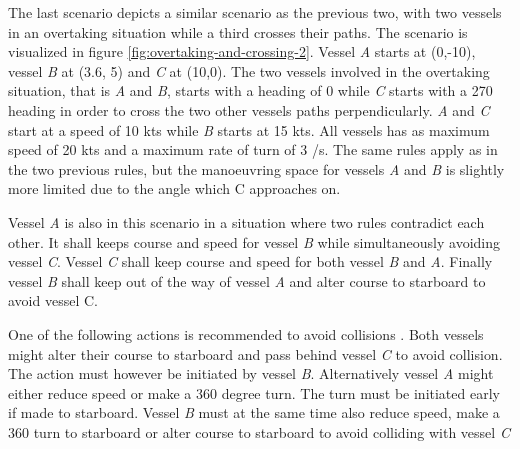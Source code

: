 The last scenario depicts a similar scenario as the previous two, with two vessels in an overtaking situation while a third crosses their paths. The scenario is visualized in figure \ref{fig:overtaking-and-crossing-2}. Vessel \textit{A} starts at (0,-10), vessel \textit{B} at (3.6, 5) and \textit{C} at (10,0). The two vessels involved in the overtaking situation, that is \textit{A} and \textit{B}, starts with a heading of 0 \textdegree while  \textit{C} starts with a 270 \textdegree heading in order to cross the two other vessels paths perpendicularly. \textit{A} and \textit{C} start at a speed of 10 kts while \textit{B} starts at 15 kts. All vessels has as maximum speed of 20 kts and a maximum rate of turn of 3 \textdegree /s. The same rules apply as in the two previous rules, but the manoeuvring space for vessels \textit{A} and \textit{B} is slightly more limited due to the angle which C approaches on.

Vessel \textit{A} is also in this scenario in a situation where two rules contradict each other.
It shall keeps course and speed for vessel \textit{B} while simultaneously avoiding vessel \textit{C}.
Vessel \textit{C} shall keep course and speed for both vessel \textit{B} and \textit{A}.
Finally vessel \textit{B} shall keep out of the way of vessel \textit{A} and alter course to starboard to avoid vessel C.

One of the following actions is recommended to avoid collisions \cite{ecolreg_overtaking-and-crossing-2}. Both vessels might alter their course to starboard and pass behind vessel \textit{C} to avoid collision. The action must however be initiated by vessel \textit{B}. Alternatively vessel \textit{A} might either reduce speed or make a 360 degree turn. The turn must be initiated early if made to starboard. Vessel \textit{B} must at the same time also reduce speed, make a 360 \textdegree turn to starboard or alter course to starboard to avoid colliding with vessel \textit{C}



